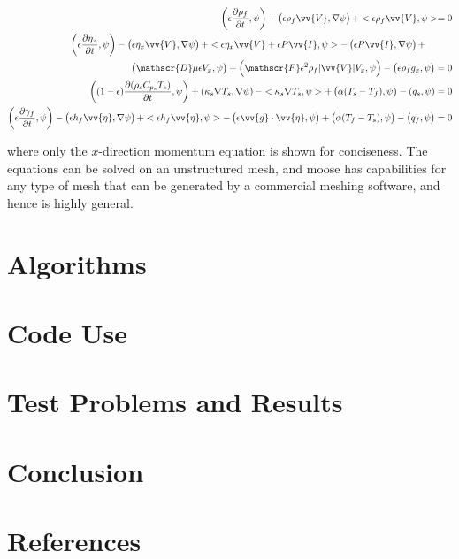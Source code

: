 \documentclass[10pt]{article}
\numberwithin{equation}{section} %
\begin{document}
\begin{equation}
\label{eq:PronghornEquations_V2WeakForm}
\begin{aligned}
\left(\epsilon \frac{\partial\rho_f}{\partial t},\psi\right)-\left(\epsilon\rho_f\vv{V},\nabla\psi\right)+< \epsilon\rho_f\vv{V},\psi>=0\\
\left(\epsilon\frac{\partial\eta_x}{\partial t},\psi\right)-\left(\epsilon\eta_x\vv{V},\nabla\psi\right)+<\epsilon\eta_x\vv{V} + \epsilon P\vv{I},\psi>-\left(\epsilon P\vv{I},\nabla\psi\right)+\hspace{1cm}\\
\left(\mathscr{D}\mu\epsilon V_x,\psi\right)+\left(\mathscr{F}\epsilon^2\rho_f|\vv{V}|V_x,\psi\right)-\left(\epsilon\rho_f g_x,\psi\right)=0\\
\left((1-\epsilon)\frac{\partial(\rho_s C_{p_s}T_s)}{\partial t},\psi\right)+\left(\kappa_s\nabla T_s,\nabla\psi\right)-<\kappa_s\nabla T_s,\psi>+\left(\alpha(T_s-T_f),\psi\right)-\left(q_s,\psi\right)=0\\
\left(\epsilon\frac{\partial\gamma_f}{\partial t},\psi\right)-\left(\epsilon h_f\vv{\eta},\nabla\psi\right)+<\epsilon h_f\vv{\eta},\psi>-\left(\epsilon\vv{g}\cdot\vv{\eta},\psi\right)+\left(\alpha(T_f-T_s),\psi\right)-\left(q_f,\psi\right)=0\\
\end{aligned}
\end{equation}

where only the \(x\)-direction momentum equation is shown for conciseness. The equations can be solved on an unstructured mesh, and \gls{moose} has capabilities for any type of mesh that can be generated by a commercial meshing software, and hence is highly general.



\section{Algorithms}
\section{Code Use}
\section{Test Problems and Results}
\section{Conclusion}
\section{References}
\end{document}
